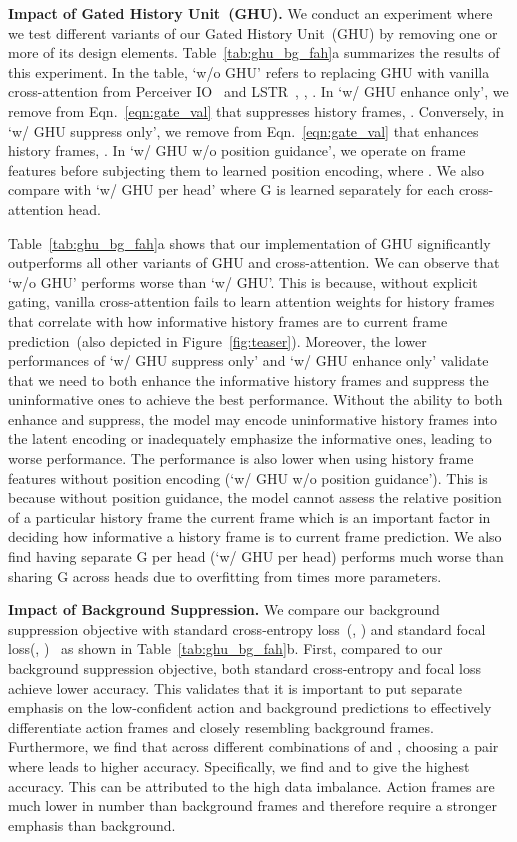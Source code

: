 \documentclass[10pt,twocolumn,letterpaper]{article}
\begin{document}
{\noindent \bf Impact of Gated History Unit~(GHU).} We conduct an experiment where we test different variants of our Gated History Unit~(GHU) by removing one or more of its design elements. Table~\ref{tab:ghu_bg_fah}a summarizes the results of this experiment. In the table, `w/o GHU' refers to replacing GHU with vanilla cross-attention from Perceiver IO~\cite{jaegle2021perceiverio} and LSTR~\cite{xu2021long}, \ie, . In `w/ GHU enhance only',  we remove  from Eqn.~\ref{eqn:gate_val} that suppresses history frames, \ie . Conversely, in `w/ GHU suppress only', we remove  from Eqn.~\ref{eqn:gate_val} that enhances history frames, \ie . In `w/ GHU w/o position guidance', we operate on frame features before subjecting them to learned position encoding, \ie  where . We also compare with `w/ GHU per head' where G is learned separately for each cross-attention head.


Table~\ref{tab:ghu_bg_fah}a shows that our implementation of GHU significantly outperforms all other variants of GHU and cross-attention. 
We can observe that `w/o GHU' performs  worse than `w/ GHU'. This is because, without explicit gating, vanilla cross-attention fails to learn attention weights for history frames that correlate with how informative history frames are to current frame prediction~(also depicted in Figure~\ref{fig:teaser}).
Moreover, the lower performances of `w/ GHU suppress only' and `w/ GHU enhance only' validate that we need to both enhance the informative history frames and suppress the uninformative ones to achieve the best performance. Without the ability to both enhance and suppress, the model may encode uninformative history frames into the latent encoding or inadequately emphasize the informative ones, leading to worse performance. 
The performance is also lower when using history frame features without position encoding (`w/ GHU w/o position guidance'). This is because without position guidance, the model cannot assess the relative position of a particular history frame \wrt the current frame which is an important factor in deciding how informative a history frame is to current frame prediction. We also find having separate G per head (`w/ GHU per head) performs much worse than sharing G across heads due to overfitting from  times more parameters.






{\noindent \bf Impact of Background Suppression.} We compare our background suppression objective with standard cross-entropy loss~(\ie, ) and standard focal loss(\ie, )~\cite{lin2017focal} as shown in Table~\ref{tab:ghu_bg_fah}b. First, compared to our background suppression objective, both standard cross-entropy and focal loss achieve lower accuracy. This validates that it is important to put separate emphasis on the low-confident action and background predictions to effectively differentiate action frames and closely resembling background frames. Furthermore, we find that across different combinations of  and , choosing a pair where  leads to higher accuracy. Specifically, we find  and  to give the highest accuracy. This can be attributed to the high data imbalance. Action frames are much lower in number than background frames and therefore require a stronger emphasis than background. 
\end{document}
